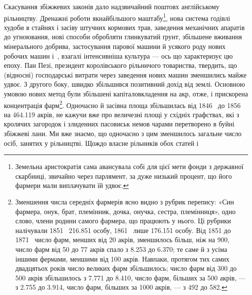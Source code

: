 \noindent{}Скасування збіжжевих законів дало надзвичайний поштовх
англійському рільництву. Дренажні роботи якнайбільшого маштабу\footnote{
Земельна аристократія сама авансувала собі для цієї мети фонди
з державної скарбниці, звичайно через парлямент, за дуже низький
процент, що його фармери мали виплачувати їй удвоє.
},
нова система годівлі худоби в стайнях і засіву штучних
кормових трав, заведення механічних апаратів до угноювання,
нові способи обробляти глинкуватий ґрунт, збільшене вживання
мінерального добрива, застосування парової машини й
усякого роду нових робочих машин і~, взагалі інтенсивніша
культура — ось що характеризує цю епоху. Пан Пезі, президент
королівського рільничого товариства, твердить, що (відносні)
господарські витрати через заведення нових машин зменшились
майже удвоє. З другого боку, швидко збільшився позитивний
дохід від землі. Основною умовою нових метод були збільшені
капіталовкладення на акр, отже, і прискорена концентрація
фарм\footnote{
Зменшення числа середніх фармерів ясно видно з рубрик перепису:
«Син фармера, онук, брат, племінник, дочка, онучка, сестра, племінниця»,
одно слово, члени родини самого фармера, що працюють у
нього. Ці рубрики налічували 1851~ \num{216.851} особу, 1861~ лише \num{176.151}
особу. Від 1851 до 1871~ число фарм, менших від 20 акрів, зменшилось
більш, ніж на 900, число фарм від 50 до 77 акрів спало з \num{8.253} до \num{6.370};
те саме й з усіма іншими фермами, меншими від 100 акрів. Навпаки,
протягом тих самих двадцятьох років число великих фарм збільшилось;
число фарм від 300 до 500 акрів збільшилось з \num{7.771} до \num{8.410}, число
фарм, більших за 500 акрів, — з \num{2.755} до \num{3.914}, число фарм, більших
за 1000 акрів, — з 492 до 582.
}. Одночасно й засівна площа збільшилась від 1846~
до 1856~ на \num{464.119} акрів, не кажучи вже про величезні площі
у східніх графствах, які з кролячих загородок і злиденних пасовиськ
немов чарами перетворено в буйні збіжжеві лани. Ми вже
знаємо, що одночасно з цим зменшилось загальне число осіб,
занятих у рільництві. Щождо власне рільників обох статей і
\parbreak{}  %
